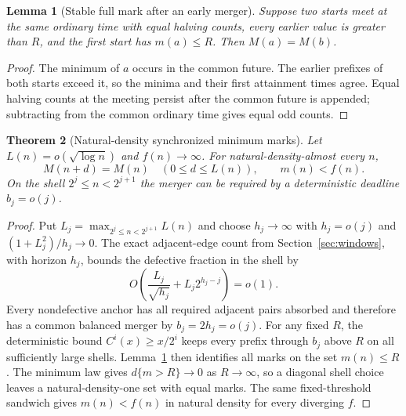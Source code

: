 \documentclass[11pt]{amsart}
\newtheorem{theorem}{Theorem}[section]
\newtheorem{lemma}[theorem]{Lemma}
\theoremstyle{definition}
\theoremstyle{remark}
\begin{document}
\begin{lemma}[Stable full mark after an early merger]\label{lem:later-mark}
Suppose two starts meet at the same ordinary time with equal halving counts, every earlier value is greater than $R$, and the first start has $m(a)\le R$. Then $M(a)=M(b)$.
\end{lemma}
\begin{proof}
The minimum of $a$ occurs in the common future. The earlier prefixes of both starts exceed it, so the minima and their first attainment times agree. Equal halving counts at the meeting persist after the common future is appended; subtracting from the common ordinary time gives equal odd counts.
\end{proof}

\begin{theorem}[Natural-density synchronized minimum marks]\label{thm:natural-mark}
Let $L(n)=o(\sqrt{\log n})$ and $f(n)\to\infty$. For natural-density-almost every $n$,
\[
 M(n+d)=M(n)\quad(0\le d\le L(n)),\qquad m(n)<f(n).
\]
On the shell $2^j\le n<2^{j+1}$ the merger can be required by a deterministic deadline $b_j=o(j)$.
\end{theorem}
\begin{proof}
Put $L_j=\max_{2^j\le n<2^{j+1}}L(n)$ and choose $h_j\to\infty$ with $h_j=o(j)$ and $(1+L_j^2)/h_j\to0$. The exact adjacent-edge count from Section~\ref{sec:windows}, with horizon $h_j$, bounds the defective fraction in the shell by
\[
 O\!\left(\frac{L_j}{\sqrt{h_j}}+L_j2^{h_j-j}\right)=o(1).
\]
Every nondefective anchor has all required adjacent pairs absorbed and therefore has a common balanced merger by $b_j=2h_j=o(j)$. For any fixed $R$, the deterministic bound $C^i(x)\ge x/2^i$ keeps every prefix through $b_j$ above $R$ on all sufficiently large shells. Lemma~\ref{lem:later-mark} then identifies all marks on the set $m(n)\le R$. The minimum law gives $d\{m>R\}\to0$ as $R\to\infty$, so a diagonal shell choice leaves a natural-density-one set with equal marks. The same fixed-threshold sandwich gives $m(n)<f(n)$ in natural density for every diverging $f$.
\end{proof}
\end{document}
